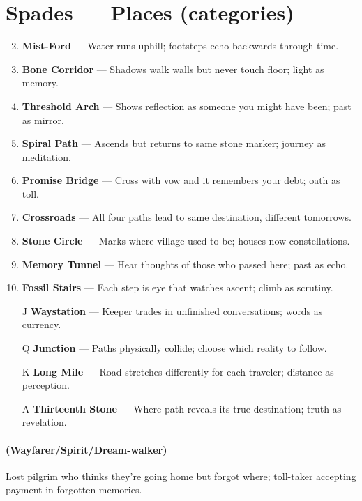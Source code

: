 \section*{Spades --- Places (categories)}
\label{sec:ways-between-places}
\begin{enumerate}
\setcounter{enumi}{1}
\item \textbf{Mist-Ford} --- Water runs uphill; footsteps echo backwards through time.
\item \textbf{Bone Corridor} --- Shadows walk walls but never touch floor; light as memory.
\item \textbf{Threshold Arch} --- Shows reflection as someone you might have been; past as mirror.
\item \textbf{Spiral Path} --- Ascends but returns to same stone marker; journey as meditation.
\item \textbf{Promise Bridge} --- Cross with vow and it remembers your debt; oath as toll.
\item \textbf{Crossroads} --- All four paths lead to same destination, different tomorrows.
\item \textbf{Stone Circle} --- Marks where village used to be; houses now constellations.
\item \textbf{Memory Tunnel} --- Hear thoughts of those who passed here; past as echo.
\item \textbf{Fossil Stairs} --- Each step is eye that watches ascent; climb as scrutiny.
\item[J] \textbf{Waystation} --- Keeper trades in unfinished conversations; words as currency.
\item[Q] \textbf{Junction} --- Paths physically collide; choose which reality to follow.
\item[K] \textbf{Long Mile} --- Road stretches differently for each traveler; distance as perception.
\item[A] \textbf{Thirteenth Stone} --- Where path reveals its true destination; truth as revelation.
\end{enumerate}

\paragraph*{(Wayfarer/Spirit/Dream-walker)} Lost pilgrim who thinks they're going home but forgot where; toll-taker accepting payment in forgotten memories.

